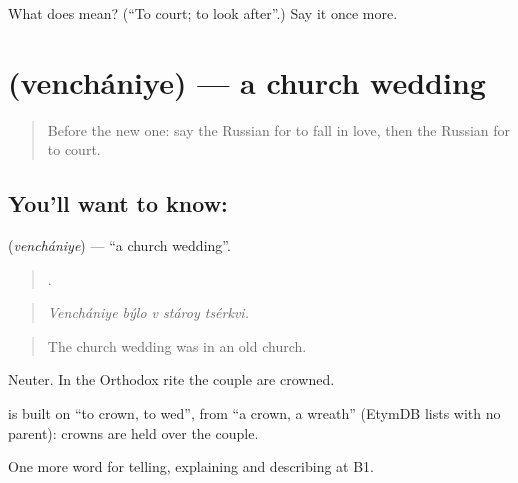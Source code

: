 \begin{tcolorbox}[breakable,colback=teal!4,colframe=teal!35!black,title={Before you move on}]
What does  mean? (\textquotedblleft{}To court; to look after\textquotedblright{}.) Say it once more.
\end{tcolorbox}
\section[\texorpdfstring{\ru{венчание} (venchániye)}{венчание (venchániye)}]{ (venchániye) — a church wedding}

\label{lesson:RU-C306-venchaniye}



\begin{quote}
Before the new one: say the Russian for to fall in love, then the Russian for to court.
\end{quote}

\subsection*{You'll want to know: }
\textbf{} (\emph{venchániye}) — \textquotedblleft{}a church wedding\textquotedblright{}.

\begin{quote}
    .
\end{quote}

\begin{quote}
\emph{Venchániye býlo v stároy tsérkvi.}
\end{quote}

\begin{quote}
The church wedding was in an old church.
\end{quote}

Neuter. In the Orthodox rite the couple are crowned.

\begin{cousinweb}
\emph{} is built on \emph{} \textquotedblleft{}to crown, to wed\textquotedblright{}, from \emph{} \textquotedblleft{}a crown, a wreath\textquotedblright{} (EtymDB lists \emph{} with no parent): crowns are held over the couple.
\end{cousinweb}

\begin{grammarlens}[title={What you've built}]
One more word for telling, explaining and describing at B1.
\end{grammarlens}

